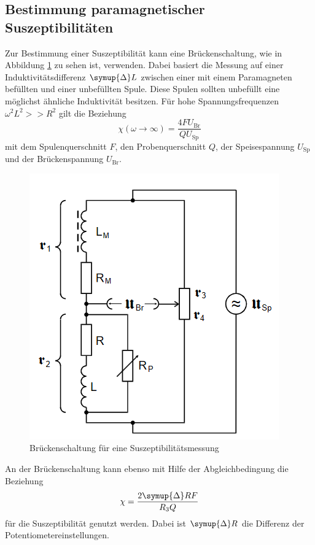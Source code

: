 \subsection{Bestimmung paramagnetischer Suszeptibilitäten}
Zur Bestimmung einer Suszeptibilität kann eine Brückenschaltung, wie in Abbildung \ref{fig:sus} zu sehen ist, verwenden. 
Dabei basiert die Messung auf einer Induktivitätsdifferenz $\symup{\Delta}L$ zwischen einer mit einem Paramagneten befüllten und einer unbefüllten Spule.
Diese Spulen sollten unbefüllt eine möglichst ähnliche Induktivität besitzen.
Für hohe Spannungsfrequenzen $\omega^2 L^2 >> R^2$ gilt die Beziehung
\begin{equation}
    \chi\left(\omega \to \infty \right) =\frac{4 F U_\text{Br}}{Q U_\text{Sp}}
    \label{eqn:chil}
\end{equation}
mit dem Spulenquerschnitt $F$, den Probenquerschnitt $Q$, der Speisespannung $U_\text{Sp}$ und der Brückenspannung $U_\text{Br}$.
\begin{figure}
    \centering
    \includegraphics[scale=0.4]{pics/sus.png}
    \caption{Brückenschaltung für eine Suszeptibilitätsmessung \cite{v606}}
    \label{fig:sus}
  \end{figure}
An der Brückenschaltung kann ebenso mit Hilfe der Abgleichbedingung die Beziehung
\begin{equation}
    \chi = \frac{2 \symup{\Delta}R F}{R_3 Q}
    \label{eqn:chir}
\end{equation}
für die Suszeptibilität genutzt werden. Dabei ist $\symup{\Delta}R$ die Differenz der Potentiometereinstellungen.
